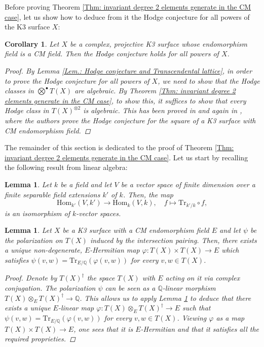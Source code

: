 \documentclass[11pt,twoside,a4paper]{amsart}
\newcommand{\0}{\mathscr{O}}
\newcommand{\Q}{\mathbb{Q}}
\theoremstyle{plain}
\newtheorem{cor}[thm]{Corollary}
\newtheorem{lem}[thm]{Lemma}
\theoremstyle{definition}
\theoremstyle{remark}
\begin{document}
\smallskip

Before proving Theorem \ref{Thm: invariant degree 2 elements generate in the CM case}, let us show how to deduce from it the Hodge conjecture for all powers of the K3 surface $X$:
\begin{cor}\cite[Thm.\ 5.4]{mari2008hodge}
\label{Cor.: H.c. for K3 of CM type}
Let $X$ be a complex, projective K3 surface whose endomorphism field is a CM field. Then the Hodge conjecture holds for all powers of $X$.
\begin{proof}
By Lemma \ref{Lem.: Hodge conjecture and Transcendental lattice}, in order to prove the Hodge conjecture for all powers of $X$, we need to show that the Hodge classes in $\bigotimes^{\bullet} T(X)$ are algebraic. By Theorem \ref{Thm: invariant degree 2 elements generate in the CM case}, to show this, it suffices to show that every Hodge class in $T(X)^{\otimes 2}$ is algebraic. This has been proved in \cite{buskin2019every} and again in \cite[Cor.\ 0.4.ii]{huybrechts2019motives}, where the authors prove the Hodge conjecture for the square of a K3 surface with CM endomorphism field.
\end{proof}
\end{cor}

The remainder of this section is dedicated to the proof of Theorem \ref{Thm: invariant degree 2 elements generate in the CM case}.
Let us start by recalling the following result from linear algebra:
\begin{lem}\cite[Lem.\ 4.3]{deligne1982hodge}
\label{Lem: Trace}
Let $k$ be a field and let $V$ be a vector space of finite dimension over a finite separable field extensions $k'$ of $k$. Then, the map
\[\mathrm{Hom}_{k'}(V,k')\rightarrow \mathrm{Hom}_k(V,k),\quad f\mapsto\mathrm{Tr}_{k'/k}\circ f,\]
is an isomorphism of $k$-vector spaces.
\end{lem}
\begin{lem}\cite[Sec.\ 2.1]{zarhin1983hodge}
\label{Lem: varphi CM K3 surface}
Let $X$ be a K3 surface with a CM endomorphism field $E$ and let $\psi$ be the polarization on $T(X)$ induced by the intersection pairing. Then, there exists a unique non-degenerate, $E$-Hermitian map $\varphi\colon T(X)\times T(X)\rightarrow  E$ which satisfies $\psi(v,w)=\mathrm{Tr}_{E/\Q}(\varphi(v,w))$ for every $v,w\in T(X)$.
\begin{proof}
Denote by $T(X)^\dag$ the space $T(X)$ with $E$ acting on it via complex conjugation. The polarization $\psi$ can be seen as a $\Q$-linear morphism $T(X)\otimes_E T(X)^\dag\rightarrow \Q$.
This allows us to apply Lemma \ref{Lem: Trace} to deduce that there exists a unique $E$-linear map $\varphi\colon T(X)\otimes_E T(X)^\dag\rightarrow E$ such that $\psi(v,w)=\mathrm{Tr}_{E/\Q}(\varphi(v,w))$ for every $v,w\in T(X)$.
Viewing $\varphi$ as a map $T(X)\times T(X)\rightarrow E$, one sees that it is $E$-Hermitian and that it satisfies all the required proprieties.
\end{proof}
\end{lem}
\end{document}
